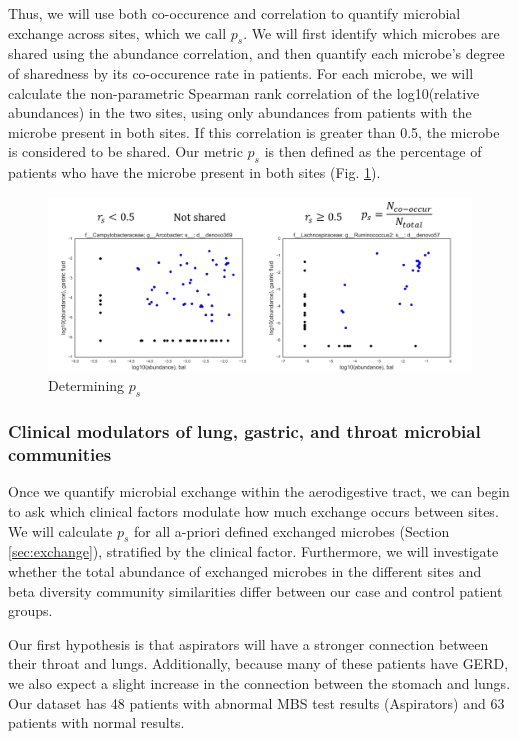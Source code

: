 \documentclass[12pt]{article}
\begin{document}
Thus, we will use both co-occurence and correlation to quantify microbial exchange across sites, which we call $p_s$. We will first identify which microbes are shared using the abundance correlation, and then quantify each microbe's degree of sharedness by its co-occurence rate in patients. For each microbe, we will calculate the non-parametric Spearman rank correlation of the log10(relative abundances) in the two sites, using only abundances from patients with the microbe present in both sites. If this correlation is greater than 0.5, the microbe is considered to be shared. Our metric $p_s$ is then defined as the percentage of patients who have the microbe present in both sites (Fig. \ref{fig:sharedness_defn}).

\begin{figure}
	\centering
    \includegraphics[scale=0.5]{sharedness_definition}
    \caption{Determining $p_s$}\label{fig:sharedness_defn}
\end{figure}


\subsubsection{Clinical modulators of lung, gastric, and throat microbial communities}
Once we quantify microbial exchange within the aerodigestive tract, we can begin to ask which clinical factors modulate how much exchange occurs between sites. We will calculate $p_s$ for all a-priori defined exchanged microbes (Section \ref{sec:exchange}), stratified by the clinical factor. Furthermore, we will investigate whether the total abundance of exchanged microbes in the different sites and beta diversity community similarities differ between our case and control patient groups.

Our first hypothesis is that aspirators will have a stronger connection between their throat and lungs. Additionally, because many of these patients have GERD, we also expect a slight increase in the connection between the stomach and lungs. Our dataset has 48 patients with abnormal MBS test results (Aspirators) and 63 patients with normal results.
\end{document}
